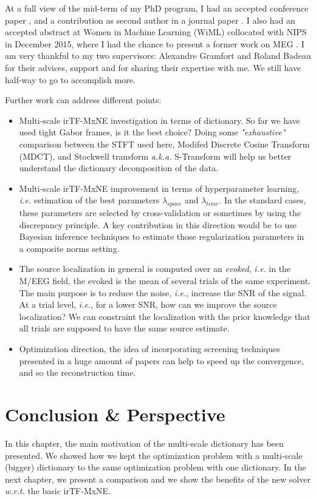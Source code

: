 At a full view of the mid-term of my PhD program, I had an accepted conference paper \cite{bekhti2016m}, and a contribution as second author in a journal paper \cite{irMxNE}. I also had an accepted abstract at Women in Machine Learning (WiML) collocated with NIPS in December 2015, where I had the chance to present a former work on MEG \cite{bekhti2014decoding}. I am very thankful to my two supervisors: Alexandre Gramfort and Roland Badeau for their advices, support and for sharing their expertise with me. We still have half-way to go to accomplish more. %

Further work can address different points:
\begin{itemize}
    \item Multi-scale irTF-MxNE investigation in terms of dictionary. So far we have used tight Gabor frames, is it the best choice? Doing some \textit{"exhaustive"} comparison between the STFT used here, Modifed Discrete Cosine Transform (MDCT), and Stockwell transform \textit{a.k.a.} S-Transform will help us better understand the dictionary decomposition of the data.
	\item Multi-scale irTF-MxNE improvement in terms of hyperparameter learning, \textit{i.e.} estimation of the best parameters $\lambda_{space}$ and $\lambda_{time}$. In the standard cases, these parameters are selected by cross-validation or sometimes by using the discrepancy principle. A key contribution in this direction would be to use Bayesian inference techniques to estimate those regularization parameters in a composite norms setting.
    \item The source localization in general is computed over an \textit{evoked}, \textit{i.e.} in the M/EEG field, the evoked is the mean of several trials of the same experiment. The main purpose is to reduce the noise, \textit{i.e.}, increase the SNR of the signal. At a trial level, \textit{i.e.}, for a lower SNR, how can we improve the source localization? We can constraint the localization with the prior knowledge that all trials are supposed to have the same source estimate.
    \item Optimization direction, the idea of incorporating screening techniques presented in a huge amount of papers can help to speed up the convergence, and so the reconstruction time.
\end{itemize}

\section{Conclusion \& Perspective}
In this chapter, the main motivation of the multi-scale dictionary has been presented. We showed how we kept the optimization problem with a multi-scale (bigger) dictionary to the same  optimization problem with one dictionary. In the next chapter, we present a comparison and we show the benefits of the new solver \textit{w.r.t.} the basic irTF-MxNE.
